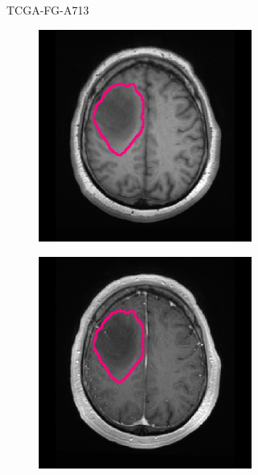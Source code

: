 \begin{subappendices}
\begin{figure}[htbp]
\begin{subfigure}[b]{0.8\textwidth}
\begin{subfigure}[b]{0.215\textwidth}
        \end{subfigure}
        \caption{TCGA-FG-A713}
    \end{subfigure}
    \begin{subfigure}[b]{0.8\textwidth}
        \centering
        \hfill
        \begin{subfigure}[b]{0.215\textwidth}
        \includegraphics[width=\textwidth, clip, trim=2.5cm 0.5cm 2.5cm 0.5cm]{Figures/Random_segs/T1_TCGA-HT-7475.png}
        \end{subfigure}
        \hfill
        \begin{subfigure}[b]{0.215\textwidth}
        \includegraphics[width=\textwidth, clip, trim=2.5cm 0.5cm 2.5cm 0.5cm]{Figures/Random_segs/T1GD_TCGA-HT-7475.png}

\end{subfigure}
\end{subfigure}
\end{figure}
\end{subappendices}
